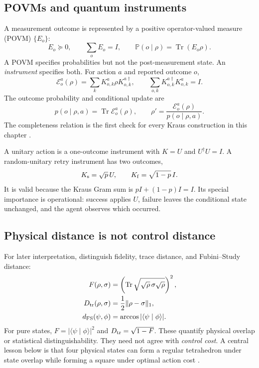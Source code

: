 \documentclass[11pt]{article}
\theoremstyle{definition}
\theoremstyle{remark}
\newcommand{\Prob}{\mathbb P}
\newcommand{\Tr}{\operatorname{Tr}}
\newcommand{\braket}[2]{\langle #1\mid #2\rangle}
\newcommand{\cE}{\mathcal E}
\begin{document}
\subsection{POVMs and quantum instruments}

A measurement outcome is represented by a positive operator-valued measure
(POVM) $\{E_o\}$:
\begin{equation}
  E_o\succeq0,\qquad \sum_oE_o=I,\qquad
  \Prob(o\mid\rho)=\Tr(E_o\rho).
  \label{eq:povm}
\end{equation}
A POVM specifies probabilities but not the post-measurement state. An
\emph{instrument} specifies both. For action $a$ and reported outcome $o$,
\begin{equation}
  \cE_o^a(\rho)=\sum_kK^a_{o,k}\rho K^{a\dagger}_{o,k},
  \qquad
  \sum_{o,k}K^{a\dagger}_{o,k}K^a_{o,k}=I.
  \label{eq:instrument}
\end{equation}
The outcome probability and conditional update are
\begin{equation}
  p(o\mid\rho,a)=\Tr\cE_o^a(\rho),\qquad
  \rho'=\frac{\cE_o^a(\rho)}{p(o\mid\rho,a)}.
  \label{eq:instrument-update}
\end{equation}
The completeness relation is the first check for every Kraus construction in
this chapter \cite{kraus1983,nielsen2010}.

A unitary action is a one-outcome instrument with $K=U$ and
$U^\dagger U=I$. A random-unitary retry instrument has two outcomes,
\begin{equation}
  K_{\rm s}=\sqrt p\,U,\qquad
  K_{\rm f}=\sqrt{1-p}\,I.
  \label{eq:basic-retry}
\end{equation}
It is valid because the Kraus Gram sum is $pI+(1-p)I=I$. Its special
importance is operational: success applies $U$, failure leaves the conditional
state unchanged, and the agent observes which occurred.

\subsection{Physical distance is not control distance}

For later interpretation, distinguish fidelity, trace distance, and
Fubini--Study distance:
\begin{align}
 F(\rho,\sigma)
 &=\left(\Tr\sqrt{\sqrt\rho\,\sigma\sqrt\rho}\right)^2,
 \label{eq:fidelity}\\
 D_{\rm tr}(\rho,\sigma)
 &=\frac12\|\rho-\sigma\|_1,
 \label{eq:trace-distance}\\
 d_{\rm FS}(\psi,\phi)
 &=\arccos|\braket{\psi}{\phi}|.
 \label{eq:fs-distance}
\end{align}
For pure states,
$F=|\braket{\psi}{\phi}|^2$ and
$D_{\rm tr}=\sqrt{1-F}$. These quantify physical overlap or statistical
distinguishability. They need not agree with \emph{control cost}. A central
lesson below is that four physical states can form a regular tetrahedron under
state overlap while forming a square under optimal action cost
\cite{holevo2011,bengtsson2017}.
\end{document}
